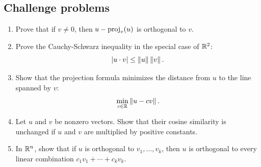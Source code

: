 \subsection*{Challenge problems}

\begin{enumerate}
\item Prove that if $v\ne 0$, then $u-\operatorname{proj}_v(u)$ is orthogonal to $v$.
\item Prove the Cauchy-Schwarz inequality in the special case of $\mathbb{R}^2$:
\[
  \left\lvert u\cdot v\right\rvert\le \left\lVert u\right\rVert\left\lVert v\right\rVert.
\]
\item Show that the projection formula minimizes the distance from $u$ to the line spanned by $v$:
\[
  \min_{c\in\mathbb{R}}\left\lVert u-cv\right\rVert.
\]
\item Let $u$ and $v$ be nonzero vectors. Show that their cosine similarity is unchanged if $u$ and $v$ are multiplied by positive constants.
\item In $\mathbb{R}^n$, show that if $u$ is orthogonal to $v_1,\ldots,v_k$, then $u$ is orthogonal to every linear combination $c_1v_1+\cdots+c_kv_k$.
\end{enumerate}


